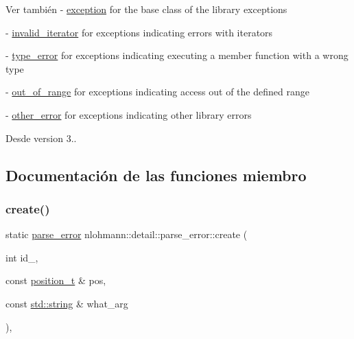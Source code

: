 \begin{DoxySeeAlso}{Ver también}
-\/ \mbox{\hyperlink{classnlohmann_1_1detail_1_1exception}{exception}} for the base class of the library exceptions 

-\/ \mbox{\hyperlink{classnlohmann_1_1detail_1_1invalid__iterator}{invalid\+\_\+iterator}} for exceptions indicating errors with iterators 

-\/ \mbox{\hyperlink{classnlohmann_1_1detail_1_1type__error}{type\+\_\+error}} for exceptions indicating executing a member function with a wrong type 

-\/ \mbox{\hyperlink{classnlohmann_1_1detail_1_1out__of__range}{out\+\_\+of\+\_\+range}} for exceptions indicating access out of the defined range 

-\/ \mbox{\hyperlink{classnlohmann_1_1detail_1_1other__error}{other\+\_\+error}} for exceptions indicating other library errors
\end{DoxySeeAlso}
\begin{DoxySince}{Desde}
version 3.. 
\end{DoxySince}


\subsection{Documentación de las funciones miembro}
\mbox{\label{classnlohmann_1_1detail_1_1parse__error_a137ea4d27de45d8a844fd13451d40f3d}} 
\subsubsection{\texorpdfstring{create()}{create()}}
{\footnotesize\ttfamily static \mbox{\hyperlink{classnlohmann_1_1detail_1_1parse__error}{parse\+\_\+error}} nlohmann\+::detail\+::parse\+\_\+error\+::create (\begin{DoxyParamCaption}\item[{int}]{id\+\_\+,  }\item[{const \mbox{\hyperlink{structnlohmann_1_1detail_1_1position__t}{position\+\_\+t}} \&}]{pos,  }\item[{const \mbox{\hyperlink{namespacenlohmann_1_1detail_a1ed8fc6239da25abcaf681d30ace4985ab45cffe084dd3d20d928bee85e7b0f21}{std\+::string}} \&}]{what\+\_\+arg }\end{DoxyParamCaption})\hspace{0.3cm}{\ttfamily [inline]}, {\ttfamily [static]}}



